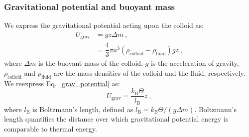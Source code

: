 \subsubsection{Gravitational potential and buoyant mass}
We express the gravitational potential acting upon the colloid as:
\begin{align}
    U_\mathrm{grav} &  = g z\Delta m ~,\\
    & = \dfrac{4}{3} \pi a^3 (\rho_\mathrm{colloid} - \rho_\mathrm{fluid}) g z~,
    \label{grav_potential}
\end{align}
where $\Delta m$ is the buoyant mass of the colloid, $g$ is the acceleration of gravity, $\rho_\mathrm{colloid}$ and $\rho_\mathrm{fluid}$ are the mass densities of the colloid and the fluid, respectively. We reexpress Eq.~\ref{grav_potential} as:
\begin{equation}
U_\mathrm{grav} = \dfrac{k_\mathrm{B} \Theta}{l_\mathrm{B}} z~,
\label{grav_potential_lB}
\end{equation}
where $l_\mathrm{B}$ is Boltzmann's length, defined as $l_\mathrm{B} = k_\mathrm{B} \Theta/(g\Delta m )$. Boltzmann's length quantifies the distance over which gravitational potential energy is comparable to thermal energy.


